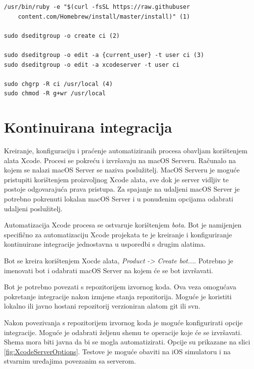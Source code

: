 \documentclass[times, utf8, diplomski, numeric]{fer}
\begin{document}
\begin{appendices}
\begin{verbatim}
/usr/bin/ruby -e "$(curl -fsSL https://raw.githubuser
    content.com/Homebrew/install/master/install)" (1)

sudo dseditgroup -o create ci (2)

sudo dseditgroup -o edit -a {current_user} -t user ci (3)
sudo dseditgroup -o edit -a xcodeserver -t user ci

sudo chgrp -R ci /usr/local (4)
sudo chmod -R g+wr /usr/local
\end{verbatim}

\section{Kontinuirana integracija}

Kreiranje, konfiguraciju i praćenje automatiziranih procesa obavljam korištenjem alata Xcode. Procesi se pokreću i izvršavaju na macOS Serveru. Računalo na kojem se nalazi macOS Server se naziva poslužitelj. MacOS Serveru je moguće pristupiti korištenjem proizvoljnog Xcode alata, sve dok je server vidljiv te postoje odgovarajuća prava pristupa. Za spajanje na udaljeni macOS Server je potrebno pokrenuti lokalan macOS Server i u ponuđenim opcijama odabrati udaljeni poslužitelj.

Automatizacija Xcode procesa se ostvaruje korištenjem \textit{bota}. Bot je namijenjen specifično za automatizaciju Xcode projekata te je kreiranje i konfiguriranje kontinuirane integracije jednostavna u usporedbi s drugim alatima.

Bot se kreira korištenjem Xocde alata, \textit{Product -> Create bot...}. Potrebno je imenovati bot i odabrati macOS Server na kojem će se bot izvršavati.

Bot je potrebno povezati s repozitorijem izvornog koda. Ova veza omogućava pokretanje integracije nakon izmjene stanja repozitorija. Moguće je koristiti lokalno ili javno hostani repozitorij verzioniran alatom git ili svn.

Nakon povezivanja s repozitorijem izvornog koda je moguće konfigurirati opcije integracije. Moguće je odabrati željenu shemu te operacije koje će se izvršavati. Shema mora biti javna da bi se mogla automatizirati. Opcije su prikazane na slici \ref{fig:XcodeServerOptions}. Testove je moguće obaviti na iOS simulatoru i na stvarnim uređajima povezanim sa serverom.


\end{appendices}
\end{document}

